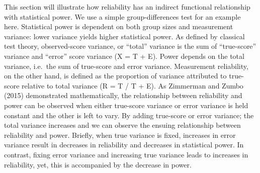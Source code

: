 \documentclass[english,,man,floatsintext]{apa6}
\begin{document}
This section will illustrate how reliability has an indirect functional relationship with statistical power. We use a simple group-differences test for an example here. Statistical power is dependent on both group sizes and measurement variance: lower variance yields higher statistical power. As defined by classical test theory, observed-score variance, or \enquote{total} variance is the sum of \enquote{true-score} variance and \enquote{error} score variance (X = T + E). Power depends on the total variance, i.e.~the sum of true-score and error variance. Measurement reliability, on the other hand, is defined as the proportion of variance attributed to true-score relative to total variance (R = T / T + E). As Zimmerman and Zumbo (2015) demonstrated mathematically, the relationship between reliability and power can be observed when either true-score variance or error variance is held constant and the other is left to vary. By adding true-score or error variance; the total variance increases and we can observe the ensuing relationship between reliability and power. Briefly, when true variance is fixed, increases in error variance result in decreases in reliability and decreases in statistical power. In contrast, fixing error variance and increasing true variance leads to increases in reliability, yet, this is accompanied by the decrease in power.
\end{document}

